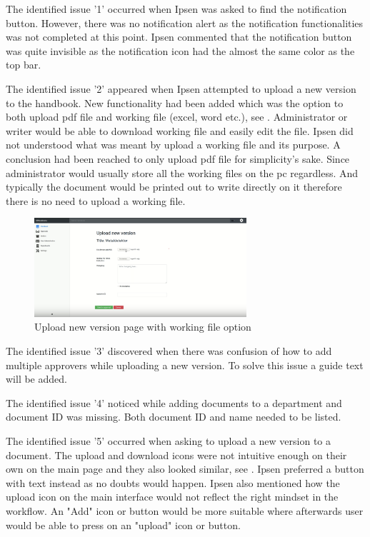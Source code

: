 The identified issue '1' occurred when Ipsen was asked to find the notification button. However, there was no notification alert as the notification functionalities was not completed at this point.
Ipsen commented that the notification button was quite invisible as the notification icon had the almost the same color as the top bar.

The identified issue '2' appeared when Ipsen attempted to upload a new version to the handbook.
New functionality had been added which was the option to both upload pdf file and working file (excel, word etc.), see .
Administrator or writer would be able to download working file and easily edit the file.
Ipsen did not understood what was meant by upload a working file and its purpose.
A conclusion had been reached to only upload pdf file for simplicity's sake.
Since administrator would usually store all the working files on the pc regardless.
And typically the document would be printed out to write directly on it therefore there is no need to upload a working file.

\begin{figure}[H]
	\centering
		\includegraphics[width=0.7\textwidth]{billeder/WorkingFile.png}
	\caption{Upload new version page with working file option}\label{fig:WorkingFile}
\end{figure}

The identified issue '3' discovered when there was confusion of how to add multiple approvers while uploading a new version.
To solve this issue a guide text will be added.

The identified issue '4' noticed while adding documents to a department and document ID was missing.
Both document ID and name needed to be listed.

The identified issue '5' occurred when asking to upload a new version to a document.
The upload and download icons were not intuitive enough on their own on the main page and they also looked similar, see .
Ipsen preferred a button with text instead as no doubts would happen.
Ipsen also mentioned how the upload icon on the main interface would not reflect the right mindset in the workflow.
An "Add" icon or button would be more suitable where afterwards user would be able to press on an "upload" icon or button.

